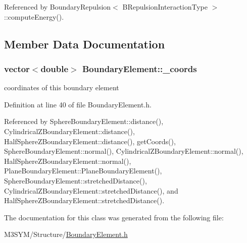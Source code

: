 Referenced by Boundary\+Repulsion$<$ B\+Repulsion\+Interaction\+Type $>$\+::compute\+Energy().



\subsection{Member Data Documentation}
\hypertarget{classBoundaryElement_ab51302e10e3e2def98438234ba5bf801}{
\subsubsection[{\+\_\+coords}]{\setlength{\rightskip}{0pt plus 5cm}vector$<$double$>$ Boundary\+Element\+::\+\_\+coords\hspace{0.3cm}{\ttfamily [protected]}}}\label{classBoundaryElement_ab51302e10e3e2def98438234ba5bf801}


coordinates of this boundary element 



Definition at line 40 of file Boundary\+Element.\+h.



Referenced by Sphere\+Boundary\+Element\+::distance(), Cylindrical\+Z\+Boundary\+Element\+::distance(), Half\+Sphere\+Z\+Boundary\+Element\+::distance(), get\+Coords(), Sphere\+Boundary\+Element\+::normal(), Cylindrical\+Z\+Boundary\+Element\+::normal(), Half\+Sphere\+Z\+Boundary\+Element\+::normal(), Plane\+Boundary\+Element\+::\+Plane\+Boundary\+Element(), Sphere\+Boundary\+Element\+::stretched\+Distance(), Cylindrical\+Z\+Boundary\+Element\+::stretched\+Distance(), and Half\+Sphere\+Z\+Boundary\+Element\+::stretched\+Distance().



The documentation for this class was generated from the following file\+:\begin{DoxyCompactItemize}
\item 
M3\+S\+Y\+M/\+Structure/\hyperlink{BoundaryElement_8h}{Boundary\+Element.\+h}\end{DoxyCompactItemize}

